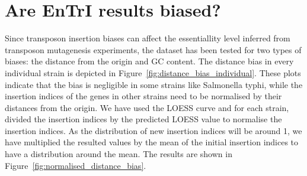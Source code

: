 \documentclass[a4paper,10pt, twocolumn]{article}
\begin{document}
\section{Are EnTrI results biased?}
Since transposon insertion biases can affect the essentiallity level inferred from transposon mutagenesis experiments, the dataset has been tested for two types of biases: the distance from the origin and GC content. The distance bias in every individual strain is depicted in Figure~\ref{fig:distance_bias_individual}. These plots indicate that the bias is negligible in some strains like Salmonella typhi, while the insertion indices of the genes in other strains need to be normalised by their distances from the origin. We have used the LOESS curve and for each strain, divided the insertion indices by the predicted LOESS value to normalise the insertion indices. As the distribution of new insertion indices will be around 1, we have multiplied the resulted values by the mean of the initial insertion indices to have a distribution around the mean. The results are shown in Figure~\ref{fig:normalised_distance_bias}.
\end{document}

